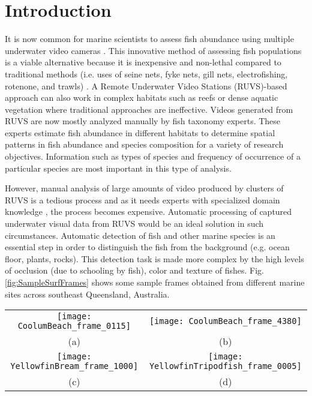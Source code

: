 \documentclass[conference]{IEEEtran}       %
\begin{document}
\section{Introduction}
\label{sec_intro}
It is now common for marine scientists to assess fish abundance using multiple underwater video cameras \cite{Salman2016}. This innovative method of assessing fish populations is a viable alternative because it is inexpensive and non-lethal compared to traditional methods (i.e. uses of seine nets, fyke nets, gill nets, electrofishing, rotenone, and trawls) \cite{Wilson2015}. A Remote Underwater Video Stations (RUVS)-based approach can also work in complex habitats such as reefs or dense aquatic vegetation where traditional approaches are ineffective. Videos generated from RUVS are now mostly analyzed manually by fish taxonomy experts. These experts estimate fish abundance in different habitats to determine spatial patterns in fish abundance and species composition for a variety of research objectives. Information such as types of species and frequency of occurrence of a particular species are most important in this type of analysis.

However, manual analysis of large amounts of video produced by clusters of RUVS is a tedious process and as it needs experts with specialized domain knowledge \cite{Gilby2k17}, the process becomes expensive. Automatic processing of captured underwater visual data from RUVS would be an ideal solution in such circumstances. Automatic detection of fish and other marine species is an essential step in order to distinguish the fish from the background (e.g. ocean floor, plants, rocks). This detection task is made more complex by the high levels of occlusion (due to schooling by fish), color and texture of fishes.  Fig.\ref{fig:SampleSurfFrames} shows some sample frames obtained from different marine sites across southeast Queensland, Australia.

\begin{figure*}[!htb]
   \centering
   \begin{tabular}{cc}
        \texttt{[image: CoolumBeach\_frame\_0115]}&
        \texttt{[image: CoolumBeach\_frame\_4380]}\\
        (a) & (b)\\
        \texttt{[image: YellowfinBream\_frame\_1000]}&
        \texttt{[image: YellowfinTripodfish\_frame\_0005]}\\
        (c) & (d)\\
   \end{tabular}
   \caption{Sample frames extracted from underwater videos obtained from different beaches across southeast Queensland, Australia. (a,b) Coolum Beach  and (c,d) Currimundi Beach}
   \label{fig:SampleSurfFrames}
   \vspace{-4ex}
\end{figure*}
\end{document}
